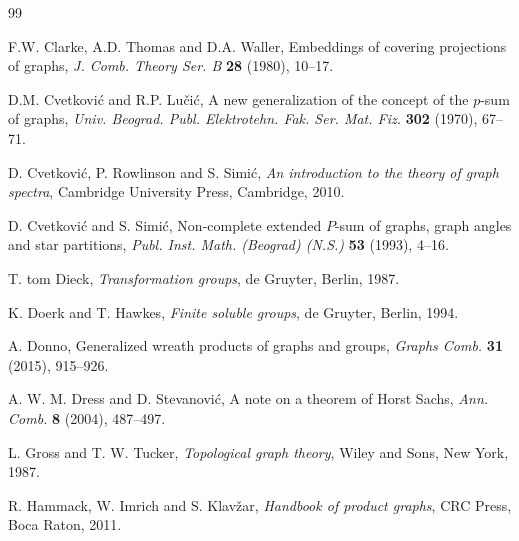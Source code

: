\documentclass{amsart}
\theoremstyle{definition}
\numberwithin{equation}{section}
\begin{document}
\begin{thebibliography}{99}



F.W. Clarke, A.D. Thomas and D.A. Waller, Embeddings of covering projections of graphs, \textit{J. Comb. Theory Ser. B} \textbf{28} (1980),  10--17.



 D.M. Cvetkovi\'{c} and R.P. Lu\v{c}i\'{c}, A new generalization of the concept of the $p$-sum of graphs, \emph{Univ. Beograd. Publ. Elektrotehn. Fak. Ser. Mat. Fiz.} {\bf 302} (1970),  67--71.

 D. Cvetkovi\'{c}, P. Rowlinson and S. Simi\'{c}, \textit{An introduction to the theory of graph spectra}, Cambridge University Press, Cambridge, 2010. 

 D. Cvetkovi\'{c} and S. Simi\'{c}, Non-complete extended $P$-sum of graphs, graph angles and star partitions, \emph{Publ. Inst. Math. (Beograd) (N.S.)} {\bf 53}  (1993), 4--16.


 T. tom Dieck, \textit{Transformation groups},  de Gruyter,  Berlin, 1987.


 K. Doerk and T. Hawkes, \textit{Finite soluble groups},  de Gruyter,  Berlin, 1994.

 A. Donno, Generalized wreath products of graphs and groups, \textit{Graphs Comb.} \textbf{31} (2015), 915--926.



 A. W. M. Dress and D. Stevanovi\'c, A note on a theorem of Horst Sachs,
\textit{Ann. Comb.} \textbf{8} (2004), 487--497.  



 L. Gross and T. W. Tucker, \textit{Topological graph theory},   Wiley and Sons, New York, 1987.



 R. Hammack, W. Imrich and S. Klavžar, \textit{Handbook of product graphs},  CRC Press, Boca Raton, 2011.



\end{thebibliography}
\end{document}
